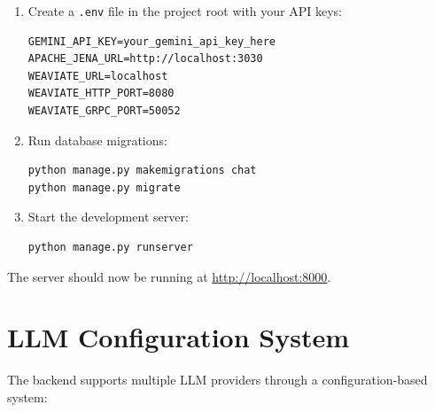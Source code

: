 \begin{enumerate}
\begin{itemize}
        \item \textbf{Weaviate} (Required):
        \begin{itemize}
            \item Use the included docker-compose file in the \texttt{weaviate} directory:
            \begin{lstlisting}[language=bash]
cd weaviate
docker-compose up -d
            \end{lstlisting}
        \end{itemize}

        \item \textbf{Ollama} (Optional):
        \begin{itemize}
            \item Only required if you want to use local LLM models
            \item Install from \url{https://ollama.ai/}
        \end{itemize}
    \end{itemize}

    \item Create a \texttt{.env} file in the project root with your API keys:
    \begin{lstlisting}
GEMINI_API_KEY=your_gemini_api_key_here
APACHE_JENA_URL=http://localhost:3030
WEAVIATE_URL=localhost
WEAVIATE_HTTP_PORT=8080
WEAVIATE_GRPC_PORT=50052
    \end{lstlisting}

    \item Run database migrations:
    \begin{lstlisting}[language=bash]
python manage.py makemigrations chat
python manage.py migrate
    \end{lstlisting}

    \item Start the development server:
    \begin{lstlisting}[language=bash]
python manage.py runserver
    \end{lstlisting}
\end{enumerate}

The server should now be running at \url{http://localhost:8000}.

\section*{LLM Configuration System}

The backend supports multiple LLM providers through a configuration-based system:

